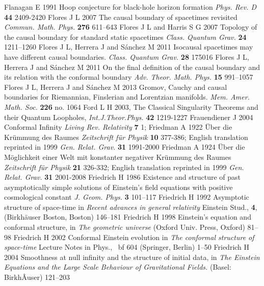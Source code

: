 \documentclass[12pt]{iopart}
\begin{document}
\begin{thebibliography}{999}
 Flanagan E 1991 Hoop conjecture for black-hole horizon formation {\it Phys. Rev. D} {\bf 44} 2409-2420
  Flores J L 2007 The causal boundary of spacetimes revisited {\it Commun. Math. Phys.} {\bf 276}  611--643
 Flores J L and Harris S G 2007 Topology of the causal boundary for standard static spacetimes {\it Class. Quantum Grav.} {\bf 24}  1211--1260
 Flores J L,  Herrera J and  S\'anchez M 2011 Isocausal spacetimes may have different causal boundaries.  {\it Class. Quantum Grav.} {\bf 28} 175016
  Flores J L,  Herrera J and  S\'anchez M 2011 On the final definition of the causal boundary and its relation with the conformal boundary {\it Adv. Theor. Math. Phys.} {\bf  15} 991--1057
 Flores J L,  Herrera J and  S\'anchez M 2013 Gromov, Cauchy and causal boundaries for Riemannian, Finslerian and Lorentzian manifolds. {\it Mem. Amer. Math. Soc.} {\bf 226} no. 1064
 Ford L H 2003, The Classical Singularity Theorems and their Quantum Loopholes, {\it Int.J.Theor.Phys.} {\bf 42}  1219-1227%
 Frauendiener J 2004 Conformal Infinity  {\it Living Rev. Relativity} {\bf 7}   1;  
 Friedman A 1922 \"{U}ber 
die Kr\"ummung des Raumes {\it Zeitschrift f\"ur Physik} {\bf 10} 
377-386; English translation reprinted in 1999 {\it Gen. Relat. Grav.} {\bf 31} 1991-2000 
 Friedman A 1924 \"{U}ber die M\"oglichkeit einer Welt mit konstanter negativer Kr\"ummung des 
Raumes {\it Zeitschrift f\"ur Physik} {\bf 21} 326-332;
English translation reprinted in 1999 {\it Gen. Relat. Grav.} {\bf 31} 2001-2008
 Friedrich H 1986 Existence and structure of past asymptotically simple solutions of Einstein's field equations with positive cosmological constant {\it J. Geom. Phys.} {\bf  3} 101--117 
 Friedrich H 1992 Asymptotic structure of space-time in {\it Recent advances in general relativity} Einstein Stud., {\bf 4}, (Birkh\"auser Boston, Boston) 146--181
 Friedrich H 1998 Einstein's equation and conformal structure, in {\it The geometric universe}  (Oxford Univ. Press, Oxford)  81--98
 Friedrich H 2002 Conformal Einstein evolution in {\it The conformal structure of space-time} Lecture Notes in Phys., {\ bf 604} (Springer, Berlin) 1--50
 Friedrich H 2004 Smoothness at null infinity and the structure of initial data, in {\it The Einstein Equations and the Large Scale Behaviour of Gravitational Fields.} (Basel: BirkhÂuser) 121--203

\end{thebibliography}
\end{document}
